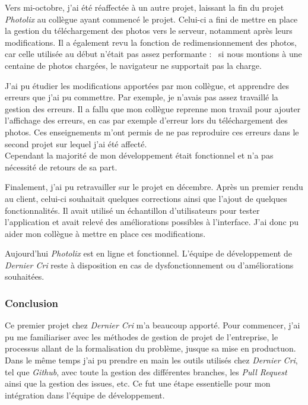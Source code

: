 \documentclass[12pt,a4paper]{article}
\begin{document}
  \bigskip

  Vers mi-octobre, j'ai été réaffectée à un autre projet, laissant la fin
  du projet \emph{Photolix} au collègue ayant commencé le projet. Celui-ci
  a fini de mettre en place la gestion du téléchargement des photos vers
  le serveur, notamment après leurs modifications. Il a également revu la
  fonction de redimensionnement des photos, car celle utilisée au début
  n'était pas assez performante : ~si nous montions à une centaine de
  photos chargées, le navigateur ne supportait pas la charge.

  \bigskip

  J'ai pu étudier les modifications apportées par mon collègue, et
  apprendre des erreurs que j'ai pu commettre. Par exemple, je n'avais pas
  assez travaillé la gestion des erreurs. Il a fallu que mon collègue
  reprenne mon travail pour ajouter l'affichage des erreurs, en cas par
  exemple d'erreur lors du téléchargement des photos. Ces enseignements
  m'ont permis de ne pas reproduire ces erreurs dans le second projet sur
  lequel j'ai été affecté.\\
  Cependant la majorité de mon développement était fonctionnel et n'a pas
  nécessité de retours de sa part.

  \bigskip

  Finalement, j'ai pu retravailler sur le projet en décembre. Après un
  premier rendu au client, celui-ci souhaitait quelques corrections ainsi
  que l'ajout de quelques fonctionnalités. Il avait utilisé un échantillon
  d'utilisateurs pour tester l'application et avait relevé des
  améliorations possibles à l'interface. J'ai donc pu aider mon collègue à
  mettre en place ces modifications.

  \bigskip

  Aujourd'hui \emph{Photolix} est en ligne et fonctionnel. L'équipe de
  développement de \emph{Dernier Cri} reste à disposition en cas de
  dysfonctionnement ou d'améliorations souhaitées.

  \subsubsection{Conclusion}\label{conclusion}

  \bigskip

  Ce premier projet chez \emph{Dernier Cri} m'a beaucoup apporté. Pour
  commencer, j'ai pu me familiariser avec les méthodes de gestion de
  projet de l'entreprise, le processus allant de la formalisation du
  problème, jusque sa mise en productuon. Dans le même temps j'ai pu
  prendre en main les outils utilisés chez \emph{Dernier Cri}, tel que
  \emph{Github}, avec toute la gestion des différentes branches, les
  \emph{Pull Request} ainsi que la gestion des issues, etc. Ce fut une
  étape essentielle pour mon intégration dans l'équipe de développement.
\end{document}
